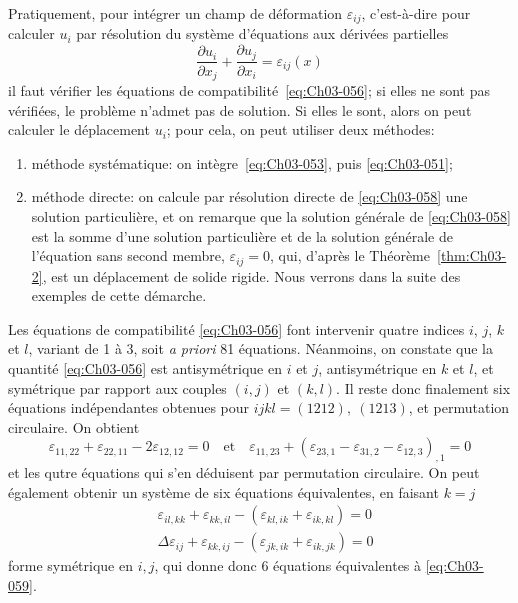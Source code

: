 Pratiquement, pour intégrer un champ de déformation $\varepsilon_{ij}$, c'est-à-dire pour calculer $u_i$ par résolution du système d'équations aux dérivées partielles 
\begin{equation}
    \frac{\partial u_i}{\partial x_j} + \frac{\partial u_j}{\partial x_i} = \varepsilon_{ij} (x)
    \label{eq:Ch03-058}
\end{equation}
il faut vérifier les équations de compatibilité~\eqref{eq:Ch03-056}; si elles ne sont pas vérifiées, le problème n'admet pas de solution. Si elles le sont, alors on peut  calculer le déplacement $u_i$; pour cela, on peut utiliser deux méthodes:
\begin{enumerate}
    \item méthode systématique: on intègre~\eqref{eq:Ch03-053}, puis \eqref{eq:Ch03-051};
    \item méthode directe: on calcule par résolution directe de \eqref{eq:Ch03-058} une solution particulière, et on remarque que la solution générale de \eqref{eq:Ch03-058} est la somme d'une solution particulière et de la solution générale de l'équation sans second membre, $\varepsilon_{ij} = 0$, qui, d'après le Théorème~\ref{thm:Ch03-2}, est un déplacement de solide rigide.
        Nous verrons dans la suite des exemples de cette démarche.
\end{enumerate}
Les équations de compatibilité \eqref{eq:Ch03-056} font intervenir quatre indices $i$, $j$, $k$ et $l$, variant de 1 à 3, soit \textit{a priori} 81 équations. Néanmoins, on constate que la quantité \eqref{eq:Ch03-056} est antisymétrique en $i$ et $j$, antisymétrique en $k$ et $l$, et symétrique par rapport aux couples $(i,j)$ et $(k,l)$.
Il reste donc finalement six équations indépendantes obtenues pour $ijkl = (1212),\ (1213)$, et permutation circulaire. On obtient
\begin{equation}
        \varepsilon_{11,22} + \varepsilon_{22,11} - 2 \varepsilon_{12,12} = 0 \quad\text{et}\quad
        \varepsilon_{11,23} + \left( \varepsilon_{23,1} - \varepsilon_{31,2} - \varepsilon_{12,3} \right)_{,1} = 0
    \label{eq:Ch03-059}
\end{equation}
et les qutre équations qui s'en déduisent par permutation circulaire.
On peut également obtenir un système de six équations équivalentes, en faisant $k=j$
\begin{equation}
    \begin{aligned}
        &\varepsilon_{il,kk} + \varepsilon_{kk,il} - \left( \varepsilon_{kl,ik} + \varepsilon_{ik,kl} \right) = 0 \\
        &\Delta\varepsilon_{ij} + \varepsilon_{kk,ij} - \left( \varepsilon_{jk,ik} + \varepsilon_{ik,jk} \right) = 0
    \end{aligned}
    \label{eq:Ch03-060}
\end{equation}
forme symétrique en $i,j$, qui donne donc 6 équations équivalentes à \eqref{eq:Ch03-059}.

